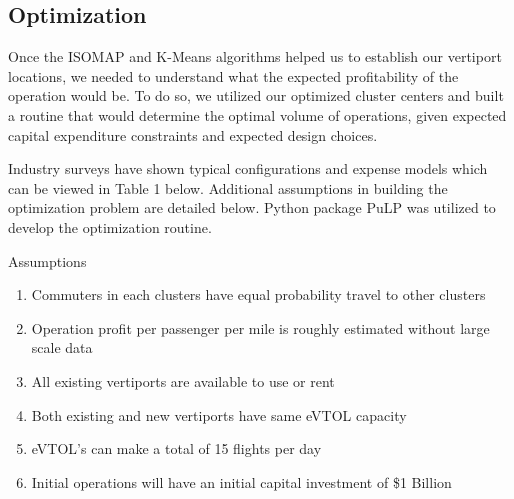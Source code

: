 \documentclass{article}
\begin{document}
\subsection{Optimization}

Once the ISOMAP and K-Means algorithms helped us to establish our vertiport locations, we needed to understand what the expected profitability of the operation would be. To do so, we utilized our optimized cluster centers and built a routine that would determine the optimal volume of operations, given expected capital expenditure constraints and expected design choices. 

Industry surveys have shown typical configurations and expense models which can be viewed in Table 1 below. Additional assumptions in building the optimization problem are detailed below. Python package PuLP was utilized to develop the optimization routine.

Assumptions
\begin{enumerate}
  \item Commuters in each clusters have equal probability travel to other clusters
  \item Operation profit per passenger per mile is roughly estimated without large scale data
  \item All existing vertiports are available to use or rent
  \item Both existing and new vertiports have same eVTOL capacity
  \item eVTOL's can make a total of 15 flights per day
  \item Initial operations will have an initial capital investment of \$1 Billion
\end{enumerate}
\end{document}
